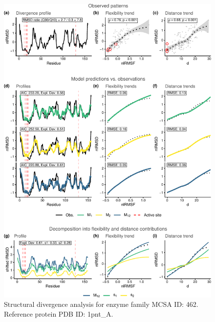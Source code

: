 \documentclass[
]{article}
\begin{document}
\clearpage
\begin{figure}[H]
\centering


\begin{center}\includegraphics{supplementary_material_files/figure-latex/generate_figures-22} \end{center}

\caption{Structural divergence analysis for enzyme family MCSA ID: 462. Reference protein PDB ID: 1pnt\_A.}
\end{figure}
\end{document}
